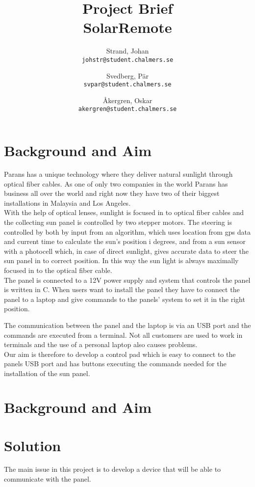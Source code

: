 \documentclass[a4paper]{article}
\author{    Strand, Johan \\ \texttt{johstr@student.chalmers.se} \and
            Svedberg, Pär\\ \texttt{svpar@student.chalmers.se} \and
            Åkergren, Oskar\\ \texttt{akergren@student.chalmers.se}
}
\title{\vspace{-3cm} Project Brief  \\ SolarRemote}
\begin{document}
	\maketitle

	\section*{Background and Aim} %
	\label{sec:background_and_aim}
	Parans has a unique technology where they deliver natural sunlight through optical fiber cables. As one of only two companies in the world Parans has business all over the world and right now they have two of their biggest installations in Malaysia and Los Angeles. \\

	\noindent With the help of optical lenses, sunlight is focused in to optical fiber cables and the collecting sun panel is controlled by two stepper motors. The steering is controlled by both by input from an algorithm, which uses location from gps data and current time to calculate the sun's position i degrees, and from a sun sensor with a photocell which, in case of direct sunlight, gives accurate data to steer the sun panel in to correct position. In this way the sun light is always maximally focused in to the optical fiber cable. \\

    \noindent The panel is connected to a 12V power supply and system that controls the panel is written in C. When users want to install the panel they have to connect the panel to a laptop and give commands to the panels' system to set it in the right position.
    
    The communication between the panel and the laptop is via an USB port and the commands are executed from a terminal. Not all customers are used to work in terminals and the use of a personal laptop also causes problems. \\

    \noindent Our aim is therefore to develop a control pad which is easy to connect to the panels USB port and has buttons executing the commands needed for the installation of the sun panel.

    \section*{Background and Aim} %
    \label{sec:background_and_aim}
    
    \section*{Solution} %
    \label{sec:solution}
    The main issue in this project is to develop a device that will be able to communicate with the panel. \\
\end{document}
